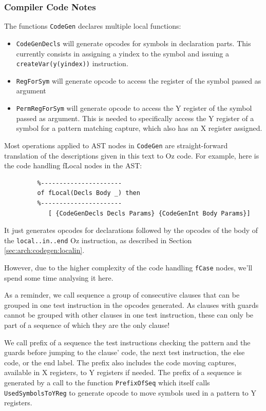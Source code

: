 \documentclass[a4paper]{memoir}
\begin{document}
\subsubsection{Compiler Code Notes}
The functions \lstinline!CodeGen! declares multiple local functions:
\begin{itemize}
  \item \lstinline!CodeGenDecls! will generate opcodes for symbols in
    declaration parts. This currently consists in assigning a yindex to the
    symbol and issuing a \lstinline!createVar(y(yindex))! instruction.
  \item \lstinline!RegForSym! will generate opcode to access the register of the
    symbol passed as argument
  \item \lstinline!PermRegForSym! will generate opcode to access the Y register
    of the symbol passed as argument. This is needed to specifically access the
    Y register of a symbol for a pattern matching capture, which also has an X
    register assigned.
\end{itemize}

Most operations applied to AST nodes in \lstinline!CodeGen! are straight-forward translation of the
descriptions given in this text to Oz code. For example, here is the
code handling fLocal nodes in the AST:

\begin{lstlisting}
         %----------------------
         of fLocal(Decls Body _) then
         %----------------------
            [ {CodeGenDecls Decls Params} {CodeGenInt Body Params}]
\end{lstlisting}

It just generates opcodes for declarations followed by the opcodes of the body
of the \lstinline!local..in..end! Oz instruction, as described in Section
\ref{sec:arch:codegen:localin}.

However, due to the higher complexity of the code handling \lstinline!fCase! nodes, we'll
spend some time analysing it here.

As a reminder, we call sequence a group of consecutive clauses that can be
grouped in one test instruction in the opcodes generated. As clauses with guards
cannot be grouped with other clauses in one test instruction, these
can only be part of a sequence of which they are the only clause!

We call prefix of a sequence the test
instructions checking the pattern and the guards before jumping to the
clause' code, the next test instruction, the else code, or the end label.
The prefix also includes the code moving captures, available in X registers,
to Y registers if needed.
The prefix of a sequence is generated by a call to the function
\lstinline!PrefixOfSeq! which itself calls \lstinline!UsedSymbolsToYReg! to
generate opcode to move symbols used in a pattern to Y registers.
\end{document}
